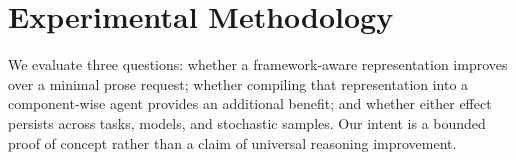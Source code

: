 \documentclass[sigconf,nonacm,anonymous]{acmart}
\begin{document}

\section{Experimental Methodology}
\label{sec:methodology}

We evaluate three questions: whether a framework-aware representation improves over a minimal prose request; whether compiling that representation into a component-wise agent provides an additional benefit; and whether either effect persists across tasks, models, and stochastic samples. Our intent is a bounded proof of concept rather than a claim of universal reasoning improvement.
\end{document}

